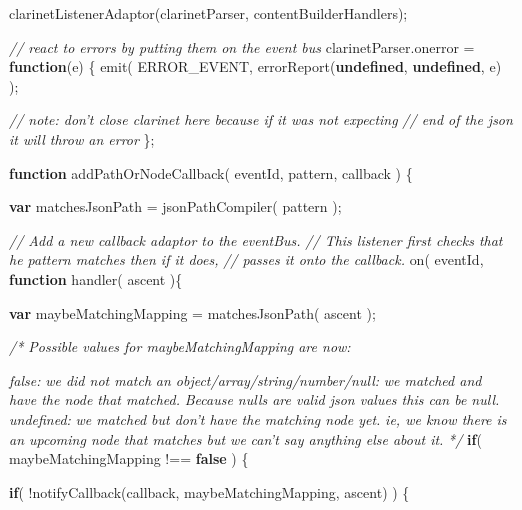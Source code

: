 \documentclass[]{article}
\newenvironment{Shaded}{}{}
\newcommand{\KeywordTok}[1]{\textcolor[rgb]{0.00,0.44,0.13}{\textbf{{#1}}}}
\newcommand{\CommentTok}[1]{\textcolor[rgb]{0.38,0.63,0.69}{\textit{{#1}}}}
\newcommand{\OtherTok}[1]{\textcolor[rgb]{0.00,0.44,0.13}{{#1}}}
\newcommand{\FunctionTok}[1]{\textcolor[rgb]{0.02,0.16,0.49}{{#1}}}
\newcommand{\NormalTok}[1]{{#1}}
\begin{document}
\begin{Shaded}
\begin{Highlighting}[]
   \FunctionTok{clarinetListenerAdaptor}\NormalTok{(clarinetParser, contentBuilderHandlers);}
  
   \CommentTok{// react to errors by putting them on the event bus}
   \OtherTok{clarinetParser}\NormalTok{.}\FunctionTok{onerror} \NormalTok{= }\KeywordTok{function}\NormalTok{(e) \{          }
      \FunctionTok{emit}\NormalTok{(}
         \NormalTok{ERROR_EVENT, }
         \FunctionTok{errorReport}\NormalTok{(}\KeywordTok{undefined}\NormalTok{, }\KeywordTok{undefined}\NormalTok{, e)}
      \NormalTok{);}
      
      \CommentTok{// note: don't close clarinet here because if it was not expecting}
      \CommentTok{// end of the json it will throw an error}
   \NormalTok{\};}

   \KeywordTok{function} \FunctionTok{addPathOrNodeCallback}\NormalTok{( eventId, pattern, callback ) \{}
   
      \KeywordTok{var} \NormalTok{matchesJsonPath = }\FunctionTok{jsonPathCompiler}\NormalTok{( pattern );}
   
      \CommentTok{// Add a new callback adaptor to the eventBus.}
      \CommentTok{// This listener first checks that he pattern matches then if it does, }
      \CommentTok{// passes it onto the callback. }
      \FunctionTok{on}\NormalTok{( eventId, }\KeywordTok{function} \FunctionTok{handler}\NormalTok{( ascent )\{ }
 
         \KeywordTok{var} \NormalTok{maybeMatchingMapping = }\FunctionTok{matchesJsonPath}\NormalTok{( ascent );}
     
         \CommentTok{/* Possible values for maybeMatchingMapping are now:}

\CommentTok{            false: }
\CommentTok{               we did not match }
\CommentTok{  }
\CommentTok{            an object/array/string/number/null: }
\CommentTok{               we matched and have the node that matched.}
\CommentTok{               Because nulls are valid json values this can be null.}
\CommentTok{  }
\CommentTok{            undefined: }
\CommentTok{               we matched but don't have the matching node yet.}
\CommentTok{               ie, we know there is an upcoming node that matches but we }
\CommentTok{               can't say anything else about it. }
\CommentTok{         */}
         \KeywordTok{if}\NormalTok{( maybeMatchingMapping !== }\KeywordTok{false} \NormalTok{) \{                                 }

            \KeywordTok{if}\NormalTok{( !}\FunctionTok{notifyCallback}\NormalTok{(callback, maybeMatchingMapping, ascent) ) \{}
            

\end{Highlighting}
\end{Shaded}
\end{document}
